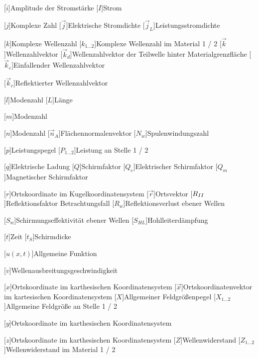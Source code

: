 \begin{acronym}[Platzhalterwort]
[$\hat i$]{\acrounit{\ampere}Amplitude der Stromstärke}
[$I$]{\acrounit{\ampere}Strom}

[$j$]{\acrounit{-}Komplexe Zahl}
[$\vec j$]{\acrounit{\ampere\per\square\meter}Elektrische Stromdichte}
[$\vec j_L$]{\acrounit{\ampere\per\square\meter}Leistungsstromdichte}

[$k$]{\acrounit{-}Komplexe Wellenzahl}
[$k_{1\ldots2}$]{\acrounit{-}Komplexe Wellenzahl im Material 1 / 2}
[$\vec k$]{\acrounit{-}Wellenzahlvektor}
[$\vec k_d$]{\acrounit{-}Wellenzahlvektor der Teilwelle hinter Materialgrenzfläche}
[$\vec k_e$]{\acrounit{-}Einfallender Wellenzahlvektor}

[$\vec k_r$]{\acrounit{-}Reflektierter Wellenzahlvektor}

[$l$]{Modenzahl}
[$L$]{\acrounit{\meter}Länge}

[$m$]{Modenzahl}

[$n$]{Modenzahl}
[$\vec n_A$]{Flächennormalenvektor}
[$N_w$]{Spulenwindungszahl}

[$p$]{\acrounit{\Dezibel}Leistungspegel}
[$P_{1\ldots2}$]{\acrounit{\watt}Leistung an Stelle 1 / 2}

[$q$]{\acrounit{\ampere\second}Elektrische Ladung}
[$Q$]{\acrounit{-}Schirmfaktor}
[$Q_e$]{\acrounit{-}Elektrischer Schirmfaktor}
[$Q_m$]{\acrounit{-}Magnetischer Schirmfaktor}

[$r$]{\acrounit{-}Ortskoordinate im Kugelkoordinatensystem}
[$\vec r$]{Ortsvektor}
[$R_{\uproman{2}}$]{Reflektionsfaktor Betrachtungsfall }
[$R_w$]{\acrounit{\Dezibel}Reflektionsverlust ebener Wellen}

[$S_w$]{\acrounit{\Dezibel}Schirmungseffektivität ebener Wellen}
[$S_{HL}$]{\acrounit{\Dezibel}Hohlleiterdämpfung}

[$t$]{\acrounit{\second}Zeit}
[$t_S$]{\acrounit{\meter}Schirmdicke}

[$u(x,t)$]{\acrounit{-}Allgemeine Funktion}

[$v$]{\acrounit{\meter\per\second}Wellenausbreitungsgeschwindigkeit}

[$x$]{\acrounit{-}Ortskoordinate im karthesischen Koordinatensystem}
[$\vec x$]{\acrounit{-}Ortskoordinatenvektor im kartesischen Koordinatensystem}
[$X$]{\acrounit{\Dezibel}Allgemeiner Feldgrößenpegel}
[$X_{1\ldots2}$]{\acrounit{-}Allgemeine Feldgröße an Stelle 1 / 2}

[$y$]{\acrounit{-}Ortskoordinate im karthesischen Koordinatensystem}

[$z$]{\acrounit{-}Ortskoordinate im karthesischen Koordinatensystem}
[$Z$]{\acrounit{-}Wellenwiderstand}
[$Z_{1\ldots2}$]{\acrounit{-}Wellenwiderstand im Material 1 / 2}

\end{acronym}
